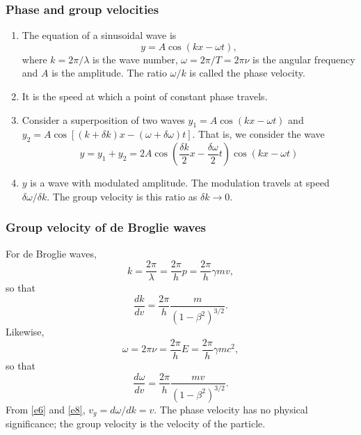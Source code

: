 \documentclass{beamer}
\begin{document}
\begin{frame}
\frametitle{Phase and group velocities}
\begin{enumerate}
\item The equation of a sinusoidal wave is
\begin{equation}\label{e3}
y = A\cos(kx - \omega t),
\end{equation}
where $k = 2\pi/\lambda$ is the wave number, $\omega = 2\pi/T = 2\pi\nu$ is the
angular frequency and $A$ is the amplitude. The ratio $\omega/k$ is called the
phase velocity. 
\item It is the speed at which a point of constant phase travels.
\item Consider a superposition of two waves $y_1 = A\cos(kx-\omega t)$ and $y_2
= A\cos[(k+\delta k)x - (\omega+\delta\omega)t]$. That is, we consider the wave
\begin{equation}\label{e4}
y = y_1 + y_2 = 2A\cos\left(\frac{\delta k}{2}x - \frac{\delta\omega}{2}t\right)
\cos(kx - \omega t)
\end{equation}
\item $y$ is a wave with modulated amplitude. The modulation travels at speed
$\delta\omega/\delta k$. The group velocity is this ratio as $\delta k
\rightarrow 0$.
\end{enumerate}
\end{frame}

\begin{frame}
\frametitle{Group velocity of de Broglie waves}
For de Broglie waves,
\begin{equation}\label{e5}
k = \frac{2\pi}{\lambda} = \frac{2\pi}{h}p = \frac{2\pi}{h}\gamma mv,
\end{equation}
so that
\begin{equation}\label{e6}
\frac{dk}{dv} = \frac{2\pi}{h}\frac{m}{(1 - \beta^2)^{3/2}}.
\end{equation}
Likewise,
\begin{equation}\label{e7}
\omega = 2\pi\nu = \frac{2\pi}{h}E = \frac{2\pi}{h}\gamma mc^2,
\end{equation}
so that
\begin{equation}\label{e8}
\frac{d\omega}{dv} = \frac{2\pi}{h}\frac{mv}{(1 - \beta^2)^{3/2}}.
\end{equation}
From \eqref{e6} and \eqref{e8}, $v_g = d\omega/dk = v$. The phase velocity has
no physical significance; the group velocity is the velocity of the particle.
\end{frame}
\end{document}
